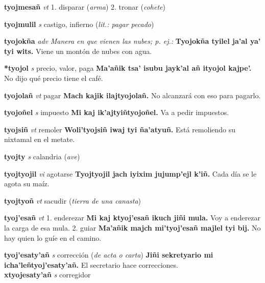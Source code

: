 \documentclass[10pt]{scrbook}
\newcommand{\entry}[1]{\textbf{#1}}
\newcommand{\onedefinition}[1]{#1.}
\newcommand{\nontranslationdef}[1]{\textit{#1}}
\newcommand{\partofspeech}[1]{\textit{#1}}
\newcommand{\spanishtranslation}[1]{#1}
\newcommand{\clarification}[1]{(\textit{#1})}
\newcommand{\cholexample}[1]{\textbf{#1}}
\newcommand{\exampletranslation}[1]{#1}
\newcommand{\secondaryentry}[1]{\\\textbf{#1}}
\newcommand{\secondpartofspeech}[1]{\textit{#1}}
\begin{document}
\begin{multicols}{2}
\entry{tyojmesañ}
\partofspeech{vt}
\onedefinition{1}
\spanishtranslation{disparar}
\clarification{arma}
\onedefinition{2}
\spanishtranslation{tronar}
\clarification{cohete}

\entry{tyojmulil}
\partofspeech{s}
\spanishtranslation{castigo, infierno}
\clarification{lit.: pagar pecado}

\entry{tyojokña}
\partofspeech{adv}
\nontranslationdef{Manera en que vienen las nubes; p. ej.:}
\cholexample{Tyojokña tyilel ja'al ya' tyi wits.}
\exampletranslation{Viene un montón de nubes con agua.}

\entry{*tyojol}
\partofspeech{s}
\spanishtranslation{precio, valor, paga}
\cholexample{Ma'añik tsa' isubu jayk'al añ ityojol kajpe'.}
\exampletranslation{No dijo qué precio tiene el café.}

\entry{tyojolañ}
\partofspeech{vt}
\spanishtranslation{pagar}
\cholexample{Mach kajik ilajtyojolañ.}
\exampletranslation{No alcanzará con eso para pagarlo.}

\entry{tyojoñel}
\partofspeech{s}
\spanishtranslation{impuesto}
\cholexample{Mi kaj ik'ajtyiñtyojoñel.}
\exampletranslation{Va a pedir impuestos.}

\entry{tyojsiñ}
\partofspeech{vt}
\spanishtranslation{remoler}
\cholexample{Woli'tyojsiñ iwaj tyi ña'atyuñ.}
\exampletranslation{Está remoliendo su nixtamal en el metate.}

\entry{tyojty}
\partofspeech{s}
\spanishtranslation{calandria}
\clarification{ave}

\entry{tyojtyojil}
\partofspeech{vi}
\spanishtranslation{agotarse}
\cholexample{Tyojtyojil jach iyixim jujump'ejl k'iñ.}
\exampletranslation{Cada día se le agota su maíz.}

\entry{tyojtyoñ}
\partofspeech{vt}
\spanishtranslation{sacudir}
\clarification{tierra de una canasta}

\entry{tyoj'esañ}
\partofspeech{vt}
\onedefinition{1}
\spanishtranslation{enderezar}
\cholexample{Mi kaj ktyoj'esañ ikuch jiñi mula.}
\exampletranslation{Voy a enderezar la carga de esa mula.}
\onedefinition{2}
\spanishtranslation{guiar}
\cholexample{Ma'añik majch mi'tyoj'esañ majlel tyi bij.}
\exampletranslation{No hay quien lo guíe en el camino.}

\entry{tyoj'esaty'añ}
\partofspeech{s}
\spanishtranslation{corrección}
\clarification{de acta o carta}
\cholexample{Jiñi sekretyario mi icha'leñtyoj'esaty'añ.}
\exampletranslation{El secretario hace correcciones.}
\secondaryentry{xtyojesaty'añ}
\secondpartofspeech{s}
\spanishtranslation{corregidor}


\end{multicols}
\end{document}
